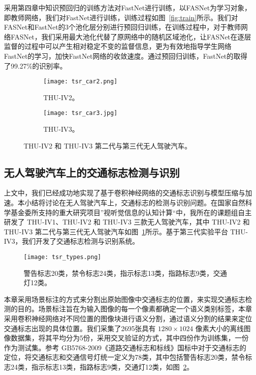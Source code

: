 采用第四章中知识预回归的训练方法对FastNet进行训练，以FASNet为学习对象，即教师网络，我们对FastNet进行训练，训练过程如图~\ref{fig:train}所示。我们对FASNet和FastNet的3个池化层分别进行预回归训练，在训练过程中，对于教师网络FASNet，我们采用最大池化代替了原网络中的随机区域池化，让FASNet在逐层监督的过程中可以产生相对稳定不变的监督信息，更为有效地指导学生网络FastNet的学习，加快FastNet网络的收敛速度。通过预回归训练，FastNet的取得了99.27\%的识别率。

\begin{figure}[h]
  \centering%
  \begin{subfigure}{0.45\textwidth}
    \texttt{[image: tsr\_car2.png]}
    \caption{THU-IV2。}
  \end{subfigure}%
  \hspace{1em}%
  \begin{subfigure}{0.4\textwidth}
    \texttt{[image: tsr\_car3.jpg]}
    \caption{THU-IV3。}
  \end{subfigure}
  \caption{THU-IV2 和 THU-IV3 第二代与第三代无人驾驶汽车。}
  \label{fig:tsr_car}
\end{figure}

\subsection{无人驾驶汽车上的交通标志检测与识别}

上文中，我们已经成功地实现了基于卷积神经网络的交通标志识别与模型压缩与加速。本小结将讨论在无人驾驶汽车上，交通标志的检测与识别问题。在国家自然科学基金委所支持的重大研究项目”视听觉信息的认知计算“中，我所在的课题组自主研发了 THU-IV1、THU-IV2 和 THU-IV3 三款无人驾驶汽车，其中 THU-IV2 和 THU-IV3 第二代与第三代无人驾驶汽车如图~\ref{fig:tsr_car}所示。基于第三代实验平台 THU-IV3，我们开发了交通标志检测与识别系统。

\begin{figure}[b]
\centering
\texttt{[image: tsr\_types.png]}
\caption{警告标志20类，禁令标志24类，指示标志13类，指路标志9类，交通灯12类。}
\label{fig:tsr_types}
\end{figure}

本章采用场景标注的方式来分割出原始图像中交通标志的位置，来实现交通标志检测的目的。场景标注旨在为输入图像的每一个像素都确定一个语义类别标签，本章采用卷积神经网络对不同位置的图像块进行语义分割，通过语义分割的结果来定位交通标志出现的具体位置。我们采集了2695张具有 $1280\times1024$ 像素大小的离线图像数据集，将其平均分为5份，采用交叉验证的方式，其中四份作为训练集，一份作为测试集。参考 GB5768-2009《道路交通标志和标线》国标中对于交通标志的定位，将交通标志和交通信号灯统一定义为78类，其中包括警告标志20类，禁令标志24类，指示标志13类，指路标志9类，交通灯12类，如图~\ref{fig:tsr_types}。


